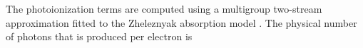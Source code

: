 \documentclass{iopjournal}
\newcommand{\e}{\ensuremath{\text{e}}}
\providecommand\Otwo{\ensuremath{\textrm{O}_2}}
\providecommand\Otwom{\ensuremath{\textrm{O}_2^-}}
\providecommand\Otwoms{\ensuremath{\textrm{O}_2^{-*}}}
\begin{document}









The photoionization terms are computed using a multigroup two-stream approximation fitted to the Zheleznyak absorption model \cite{1982TepVT..20..423Z}.
The physical number of photons that is produced per electron is
\end{document}
